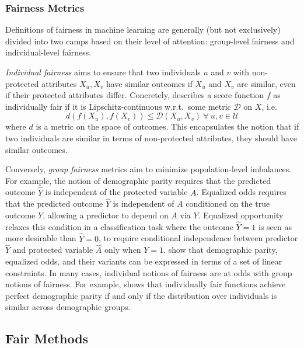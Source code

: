     \subsubsection{Fairness Metrics}  \label{sec:intro_fairmetrics}
    
        Definitions of fairness in machine learning are generally (but not exclusively) divided into two camps based on their level of attention: group-level fairness and individual-level fairness.
        
        \emph{Individual fairness} aims to ensure that two individuals $u$ and $v$ with non-protected attributes $X_u, X_v$ have similar outcomes if $X_u$ and $X_v$ are similar, even if their protected attributes differ. Concretely, \citep{dwork2012fairness} describes a score function $f$ as individually fair if it is Lipschitz-continuous w.r.t.\ some metric $\mathcal{D}$ on $X$, i.e.\
        \begin{equation}d(f(X_u), f(X_v)) \le \mathcal{D}(X_u, X_v) ~\forall~ u, v \in \mathcal{U}\label{eqn:IndFair}\end{equation}
        where $d$ is a metric on the space of outcomes. This encapsulates the notion that if two individuals are similar in terms of non-protected attributes, they should have similar outcomes.
        
        Conversely, \emph{group fairness} metrics aim to minimize population-level imbalances. For example, the notion of demographic parity \citep{dwork2012fairness} requires that the predicted outcome $\hat{Y}$ is independent of the protected variable $A$. Equalized odds \citep{HarPriSre2016} requires that the predicted outcome $\hat{Y}$ is independent of $A$ conditioned on the true outcome $Y$, allowing a predictor to depend on $A$ via $Y$. Equalized opportunity \citep{HarPriSre2016} relaxes this condition in a classification task where the outcome $\hat{Y}=1$ is seen as more desirable than $\hat{Y}=0$, to require conditional independence between predictor $\hat{Y}$ and protected variable $\hat{A}$ only when $Y=1$. \cite{AgaBeyDudLanWal2018} show that demographic parity, equalized odds, and their variants can be expressed in terms of a set of linear constraints.  In many cases, individual notions of fairness are at odds with group notions of fairness. For example, \cite{dwork2012fairness} shows that individually fair functions achieve perfect demographic parity if and only if the distribution over individuals is similar across demographic groups.

    \subsection{Fair Methods}
        
